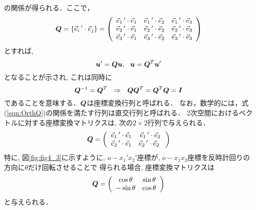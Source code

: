 \documentclass[10pt,a4j]{jarticle}
\begin{document}
の関係が得られる．ここで，
\begin{equation}
	\mbox{\boldmath $Q$}=
	\left\{
		\vec{e}_i\,'\cdot \vec{e}_j
	\right\}
	=
	\left( 
	\begin{array}{ccc}
		\vec{e}_1\,'\cdot \vec{e}_1 & \vec{e}_1\,'\cdot \vec{e}_2 & \vec{e}_1\,'\cdot \vec{e}_3 \\
		\vec{e}_2\,'\cdot \vec{e}_1 & \vec{e}_2\,'\cdot \vec{e}_2 & \vec{e}_2\,'\cdot \vec{e}_3 \\
		\vec{e}_3\,'\cdot \vec{e}_1 & \vec{e}_3\,'\cdot \vec{e}_2 & \vec{e}_3\,'\cdot \vec{e}_3 
	\end{array}
	\right)
\end{equation}
とすれば, 
\begin{equation}
	\fat{u}'=\fat{Q}\fat{u}, \ \ 
	\fat{u}=\fat{Q}^T\fat{u}'
\end{equation}
となることが示され, これは同時に
\begin{equation}
	\fat{Q}^{-1}=\fat{Q}^{T} \ \ \Rightarrow \ \ \fat{QQ}^T=\fat{Q}^T\fat{Q}=\fat{I}
	\label{eqn:OrthQ}
\end{equation}
であることを意味する．$\mbox{\boldmath $Q$}$は座標変換行列と呼ばれる．
なお，数学的には，式(\ref{eqn:OrthQ})の関係を満たす行列は直交行列と呼ばれる．
2次空間におけるベクトルに対する座標変換マトリクスは, 次の$2\times 2$行列で与えられる．
\begin{equation}
	\mbox{\boldmath $Q$}=
	\left( 
	\begin{array}{cc}
		\vec{e}_1\,'\cdot \vec{e}_1 & \vec{e}_1\,'\cdot \vec{e}_2 \\
		\vec{e}_2\,'\cdot \vec{e}_1 & \vec{e}_2\,'\cdot \vec{e}_2 \
	\end{array}
	\right)
\end{equation}
特に, 図\ref{fig:fig4_3}に示すように, $o-x_1'x_2'$座標が, $o-x_1x_2$座標を反時計回りの方向に$\theta$だけ回転させることで
得られる場合, 座標変換マトリクスは
\begin{equation}
	\mbox{\boldmath $Q$}=
	\left( 
	\begin{array}{cc}
		 \cos \theta & \sin \theta \\
		-\sin \theta & \cos \theta 
	\end{array}
	\right)
	\label{eqn:Qth}
\end{equation}
と与えられる．
\end{document}
